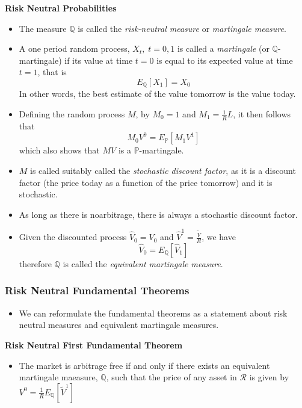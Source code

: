 \documentclass[11pt]{article}
\begin{document}
\textbf{Risk Neutral Probabilities}
\begin{itemize}
    \item The measure $\mathbb{Q}$ is called the \textit{risk-neutral measure} or 
    \textit{martingale measure}.
    \item A one period random process, $X_t, \; t=0,1$ is called a \textit{martingale} (or 
    $\mathbb{Q}$-martingale) if its value at time $t=0$ is equal to its expected value at time 
    $t=1$, that is
    \[E_{\mathbb{Q}}[X_1] = X_0\]
    In other words, the best estimate of the value tomorrow is the value today.
    \item Defining the random process $M$, by $M_0=1$ and $M_1=\frac{1}{R}L$, it then follows 
    that 
    \[M_0 V^0 = E_{\mathbb{P}}[M_1 V^1]\]
    which also shows that $MV$ is a $\mathbb{P}$-martingale.
    \item $M$ is called suitably called the \textit{stochastic discount factor}, as it is a 
    discount factor (the price today as a function of the price tomorrow) and it is stochastic.
    \item As long as there is noarbitrage, there is always a stochastic discount factor. 
    \item Given the discounted process $\hat{V}_0 = V_0$ and $\hat{V}^1 = \frac{\tilde{V}}{R}$,
    we have 
    \[\hat{V}_0 = E_{\mathbb{Q}}[\hat{V}_1]\]
    therefore $\mathbb{Q}$ is called the \textit{equivalent martingale measure}.
\end{itemize}


\subsubsection{Risk Neutral Fundamental Theorems}
\begin{itemize}
    \item We can reformulate the fundamental theorems as a statement about risk neutral
    measures and equivalent martingale measures.
\end{itemize}

\textbf{Risk Neutral First Fundamental Theorem}
\begin{itemize}
    \item The market is arbitrage free if and only if there exists an equivalent martingale 
    maeasure, $\mathbb{Q}$, such that the price of any asset in $\mathcal{R}$ is given by 
    $V^0 = \frac{1}{R}E_{\mathbb{Q}}[\tilde{V}^1]$
\end{itemize}
\end{document}
